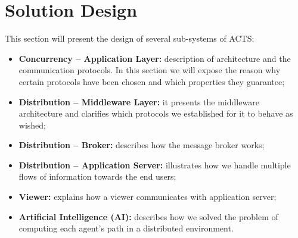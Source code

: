 \section{Solution Design}\label{sec:sol-design}

This section will present the design of several sub-systems of ACTS:

\begin{itemize}
\item \textbf{Concurrency -- Application Layer:}
  description of architecture and the communication protocols.
  In this section we
  will expose the reason why certain protocols have been chosen and which
  properties they guarantee;
\item \textbf{Distribution -- Middleware Layer:}
  it presents the middleware architecture and clarifies which protocols
  we established for it to behave as wished;
\item \textbf{Distribution -- Broker:}
  describes how the message broker works;
\item \textbf{Distribution -- Application Server:}
  illustrates how we handle multiple flows of information towards the end
  users;
\item \textbf{Viewer:}
  explains how a viewer communicates with application server;
\item \textbf{Artificial Intelligence (AI):}
  describes how we solved the problem of computing each agent's path
  in a distributed environment.
\end{itemize}







